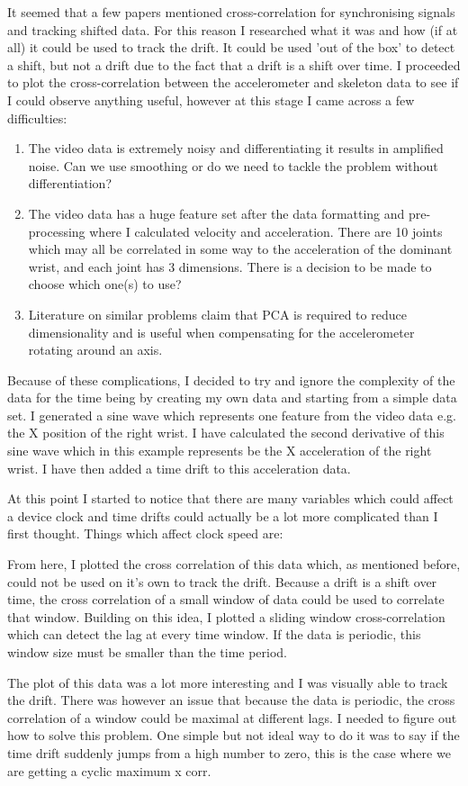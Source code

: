 It seemed that a few papers mentioned cross-correlation for synchronising signals and tracking shifted data. For this reason I researched what it was and how (if at all) it could be used to track the drift. It could be used 'out of the box' to detect a shift, but not a drift due to the fact that a drift is a shift over time. I proceeded to plot the cross-correlation between the accelerometer and skeleton data to see if I could observe anything useful, however at this stage I came across a few difficulties:
\begin{enumerate}
    \item The video data is extremely noisy and differentiating it results in amplified noise. Can we use smoothing or do we need to tackle the problem without differentiation?
    \item The video data has a huge feature set after the data formatting and pre-processing where I calculated velocity and acceleration. There are 10 joints which may all be correlated in some way to the acceleration of the dominant wrist, and each joint has 3 dimensions. There is a decision to be made to choose which one(s) to use?
    \item Literature on similar problems claim that PCA is required to reduce dimensionality and is useful when compensating for the accelerometer rotating around an axis.
\end{enumerate}   

Because of these complications, I decided to try and ignore the complexity of the data for the time being by creating my own data and starting from a simple data set. I generated a sine wave which represents one feature from the video data e.g. the X position of the right wrist. I have calculated the second derivative of this sine wave which in this example represents be the X acceleration of the right wrist. I have then added a time drift to this acceleration data.

At this point I started to notice that there are many variables which could affect a device clock and time drifts could actually be a lot more complicated than I first thought. Things which affect clock speed are:

From here, I plotted the cross correlation of this data which, as mentioned before, could not be used on it's own to track the drift. Because a drift is a shift over time, the cross correlation of a small window of data could be used to correlate that window. Building on this idea, I plotted a sliding window cross-correlation which can detect the lag at every time window. If the data is periodic, this window size must be smaller than the time period.

The plot of this data was a lot more interesting and I was visually able to track the drift. There was however an issue that because the data is periodic, the cross correlation of a window could be maximal at different lags. I needed to figure out how to solve this problem. One simple but not ideal way to do it was to say if the time drift suddenly jumps from a high number to zero, this is the case where we are getting a cyclic maximum x corr. 
